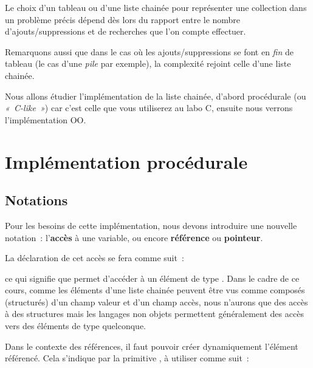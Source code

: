	Le choix d'un tableau ou d'une liste chainée pour représenter 
	une collection dans un problème précis dépend dès lors du
	rapport entre le nombre d'ajouts/suppressions et de recherches 
	que l'on compte effectuer.

	
	Remarquons aussi que dans le cas où les ajouts/suppressions se font 
	en \textit{fin} de tableau (le cas d'une \textit{pile} par exemple), 
	la complexité rejoint celle d'une liste chainée.

	Nous allons étudier l'implémentation de la liste chainée, 
	d'abord procédurale (ou \textit{«~C-like~»}) car c'est celle
	que vous utiliserez au labo C, ensuite nous verrons l'implémentation OO.


\section{Implémentation procédurale}

	\subsection{Notations}
	
	Pour les besoins de cette implémentation, nous devons introduire 
	une nouvelle notation~: l'\textbf{accès} à une
	variable, ou encore \textbf{référence} ou \textbf{pointeur}.

	La déclaration de cet accès se fera comme suit~:


	ce qui signifie que  permet d'accéder à un élément 
	de type . 
	Dans le cadre de ce cours, comme les éléments d'une liste
	chainée peuvent être vus comme composés (structurés) d'un champ valeur 
	et d'un champ accès, nous n'aurons que des accès
	à des structures mais les langages non objets permettent généralement 
	des accès vers des éléments de type quelconque.

	Dans le contexte des références, il faut pouvoir créer dynamiquement 
	l'élément référencé. Cela s'indique par la
	primitive , à utiliser comme suit~:

	
